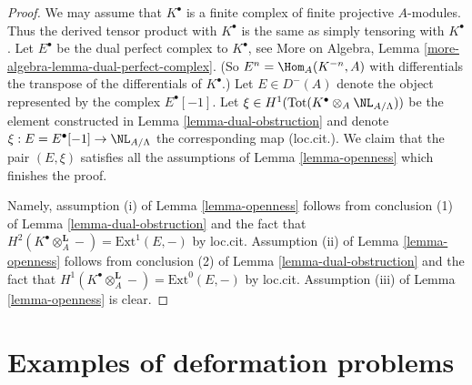\begin{proof}
We may assume that $K^\bullet$ is a finite complex of finite projective
$A$-modules. Thus the derived tensor product with $K^\bullet$ is the
same as simply tensoring with $K^\bullet$. Let
$E^\bullet$ be the dual perfect complex to $K^\bullet$, see
More on Algebra, Lemma \ref{more-algebra-lemma-dual-perfect-complex}.
(So $E^n = \Hom_A(K^{-n}, A)$ with differentials the transpose of the
differentials of $K^\bullet$.) Let $E \in D^{-}(A)$ denote the
object represented by the complex $E^\bullet[-1]$.
Let $\xi \in H^1(\text{Tot}(K^\bullet \otimes_A \NL_{A/\Lambda}))$
be the element constructed in Lemma \ref{lemma-dual-obstruction}
and denote $\xi : E = E^\bullet[-1] \to \NL_{A/\Lambda}$ the corresponding
map (loc.cit.). We claim that the pair $(E, \xi)$ satisfies all the
assumptions of Lemma \ref{lemma-openness} which finishes the proof.

\medskip\noindent
Namely, assumption (i) of Lemma \ref{lemma-openness} follows from conclusion
(1) of Lemma \ref{lemma-dual-obstruction}
and the fact that $H^2(K^\bullet \otimes_A^\mathbf{L} -) =
\text{Ext}^1(E, -)$ by loc.cit. Assumption (ii) of
Lemma \ref{lemma-openness} follows from conclusion (2) of
Lemma \ref{lemma-dual-obstruction}
and the fact that $H^1(K^\bullet \otimes_A^\mathbf{L} -) =
\text{Ext}^0(E, -)$ by loc.cit. Assumption (iii) of Lemma \ref{lemma-openness}
is clear.
\end{proof}








\section{Examples of deformation problems}
\label{section-examples}

